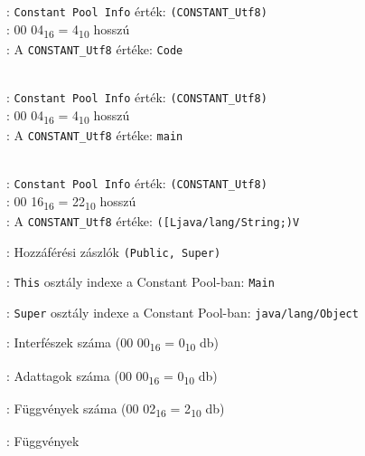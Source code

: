 \begin{compactitem}
\begin{compactitem}
	: \lstinline{Constant Pool Info} érték: \lstinline{(CONSTANT_Utf8)} \\
    : 00 04\textsubscript{16} = 4\textsubscript{10} hosszú \\
    : A \lstinline{CONSTANT_Utf8} értéke: \lstinline{Code}
	\item {}   \\
	: \lstinline{Constant Pool Info} érték: \lstinline{(CONSTANT_Utf8)} \\
    : 00 04\textsubscript{16} = 4\textsubscript{10} hosszú \\
    : A \lstinline{CONSTANT_Utf8} értéke: \lstinline{main}
	\item {}   \\
	: \lstinline{Constant Pool Info} érték: \lstinline{(CONSTANT_Utf8)} \\
    : 00 16\textsubscript{16} = 22\textsubscript{10} hosszú \\
    : A \lstinline{CONSTANT_Utf8} értéke: \lstinline{([Ljava/lang/String;)V}
\end{compactitem}
\item {}: Hozzáférési zászlók \lstinline{(Public, Super)}
\item {}: \lstinline{This} osztály indexe a Constant Pool-ban: \lstinline{Main}
\item {}: \lstinline{Super} osztály indexe a Constant Pool-ban: \lstinline{java/lang/Object}
\item {}: Interfészek száma (00 00\textsubscript{16} = 0\textsubscript{10} db)
\item {}: Adattagok száma (00 00\textsubscript{16} = 0\textsubscript{10} db)
\item {}: Függvények száma (00 02\textsubscript{16} = 2\textsubscript{10} db)
\item {}: Függvények
\begin{compactitem}

\end{compactitem}
\end{compactitem}
